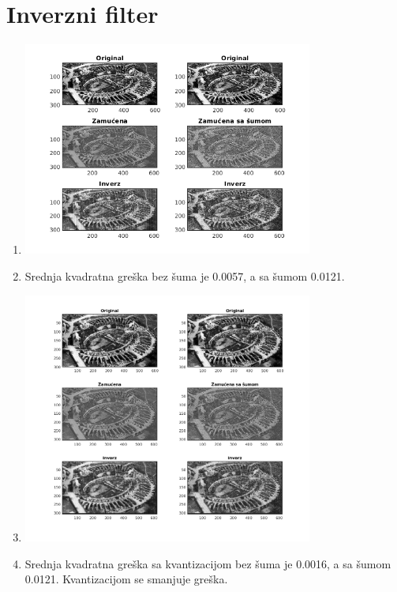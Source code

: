\documentclass[12pt, a4]{report}
\begin{document}
\section{Inverzni filter}
\begin{enumerate}
	\item
	      \begin{minipage}{\linewidth}
		      \centering
		      \includegraphics[width=0.75\textwidth]{inverse}
	      \end{minipage}
	\item
	      Srednja kvadratna greška bez šuma je 0.0057, a sa šumom 0.0121.

	\item
	      \begin{minipage}{\linewidth}
		      \centering
		      \includegraphics[width=0.75\textwidth]{inversequant}
	      \end{minipage}
	\item
	      Srednja kvadratna greška sa kvantizacijom bez šuma je 0.0016, a sa šumom 0.0121. Kvantizacijom se smanjuje greška.
\end{enumerate}
\end{document}
